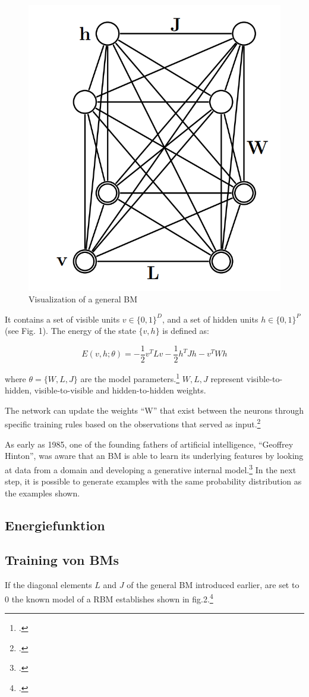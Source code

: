 \begin{figure}[H]
    \centering
    \includegraphics[width=0.25\linewidth]{graphics/General_BM.png}
    \caption{Visualization of a general \ac{BM}}
\end{figure}

It contains a set of visible units \( v \in \{0, 1\}^D \), and a set of hidden units \( h \in \{0, 1\}^P \) (see Fig. 1). The energy of the state \( \{v, h\} \) is defined as:

\begin{equation}
E(v, h; \theta) = -\frac{1}{2} v^T L v - \frac{1}{2} h^T J h - v^T W h
\end{equation}

where \( \theta = \{W, L, J\} \) are the model parameters.\footcite[448][Vgl.]{salakhutdinovDeepBoltzmannMachines2009}
\( W, L, J \) represent visible-to-hidden, visible-to-visible and hidden-to-hidden weights.
 

The network can update the weights ``W'' that exist between the neurons through specific training rules based on the observations that served as input.\footcite[Vgl.][1-2]{barraEquivalenceHopfieldNetworks2012}

As early as 1985, one of the founding fathers of artificial intelligence, ``Geoffrey Hinton'', was aware that an \ac{BM} is able to learn its underlying features by looking at data from a domain and developing a generative internal model.\footcite[Vgl.][148]{ackleyLearningAlgorithmBoltzmann1985}
In the next step, it is possible to generate examples with the same probability distribution as the examples shown.


\subsection{Energiefunktion}
\subsection{Training von BMs}





If the diagonal elements \( L \) and \( J \) of the general \ac{BM} introduced earlier, are set to 0 the known model of a \ac{RBM} establishes shown in fig.2.\footcite[Vgl.][449]{salakhutdinovDeepBoltzmannMachines2009}

